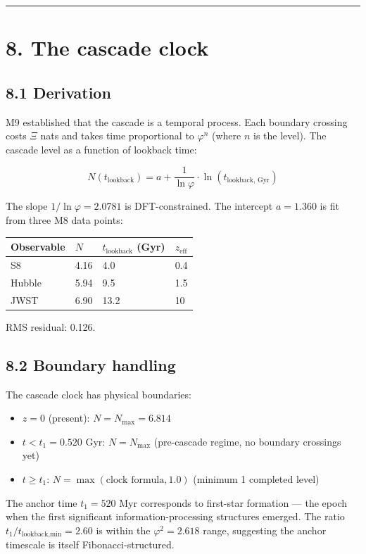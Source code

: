 \documentclass[11pt,a4paper]{article}
\providecommand{\tightlist}{\setlength{\itemsep}{0pt}\setlength{\parskip}{0pt}}
\begin{document}
\begin{center}\rule{0.5\linewidth}{0.4pt}\end{center}

\section*{8. The cascade clock}

\subsection*{8.1 Derivation}

M9 established that the cascade is a temporal process. Each boundary crossing costs $\Xi$ nats and takes time proportional to $\varphi^n$ (where $n$ is the level). The cascade level as a function of lookback time:

\[N(t_{\text{lookback}}) = a + \frac{1}{\ln\varphi} \cdot \ln(t_{\text{lookback, Gyr}})\]

The slope $1/\ln\varphi = 2.0781$ is DFT-constrained. The intercept $a = 1.360$ is fit from three M8 data points:

\begin{longtable}[]{@{}llll@{}}
\toprule
Observable & $N$ & $t_{\text{lookback}}$ (Gyr) & $z_{\text{eff}}$ \\
\midrule\endhead
S8 & 4.16 & 4.0 & 0.4 \\
Hubble & 5.94 & 9.5 & 1.5 \\
JWST & 6.90 & 13.2 & 10 \\
\bottomrule
\end{longtable}

RMS residual: 0.126.

\subsection*{8.2 Boundary handling}

The cascade clock has physical boundaries:
\begin{itemize}\tightlist
\item $z = 0$ (present): $N = N_{\text{max}} = 6.814$
\item $t < t_1 = 0.520$ Gyr: $N = N_{\text{max}}$ (pre-cascade regime, no boundary crossings yet)
\item $t \geq t_1$: $N = \max(\text{clock formula}, 1.0)$ (minimum 1 completed level)
\end{itemize}

The anchor time $t_1 = 520$ Myr corresponds to first-star formation — the epoch when the first significant information-processing structures emerged. The ratio $t_1 / t_{\text{lookback,min}} = 2.60$ is within the $\varphi^2 = 2.618$ range, suggesting the anchor timescale is itself Fibonacci-structured.
\end{document}
